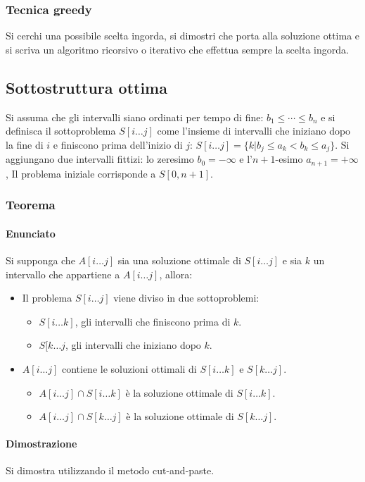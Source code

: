 \subsubsection{Tecnica greedy}
Si cerchi una possibile scelta ingorda, si dimostri che porta alla soluzione ottima e si scriva un algoritmo ricorsivo o iterativo che effettua sempre la scelta ingorda.
\subsection{Sottostruttura ottima}
Si assuma che gli intervalli siano ordinati per tempo di fine: $b_1\le \cdots\le b_n$ e si definisca il sottoproblema $S[i\dots j]$ come l'insieme di intervalli che iniziano dopo la fine
di $i$ e finiscono prima dell'inizio di $j$: $S[i\dots j] = \{k|b_j\le a_k < b_k\le a_j\}$. Si aggiungano due intervalli fittizi: lo zeresimo $b_0=-\infty$ e l'$n+1$-esimo 
$a_{n+1} = +\infty$, Il problema iniziale corrisponde a $S[0, n+1]$. 
\subsubsection{Teorema}
\paragraph{Enunciato}
Si supponga che $A[i\dots j]$ sia una soluzione ottimale di $S[i\dots j]$ e sia $k$ un intervallo che appartiene a $A[i\dots j]$, allora:
\begin{itemize}
	\item Il problema $S[i\dots j]$ viene diviso in due sottoproblemi:
		\begin{itemize}
			\item $S[i\dots k]$, gli intervalli che finiscono prima di $k$.
			\item $S[k\dots j$, gli intervalli che iniziano dopo $k$.
		\end{itemize}
	\item $A[i\dots j]$ contiene le soluzioni ottimali di $S[i\dots k]$ e $S[k\dots j]$.
		\begin{itemize}
			\item $A[i\dots j]\cap S[i\dots k]$ \`e la soluzione ottimale di $S[i\dots k]$.
			\item $A[i\dots j]\cap S[k\dots j]$ \`e la soluzione ottimale di $S[k\dots j]$.
		\end{itemize}
\end{itemize}
\paragraph{Dimostrazione}
Si dimostra utilizzando il metodo cut-and-paste.
